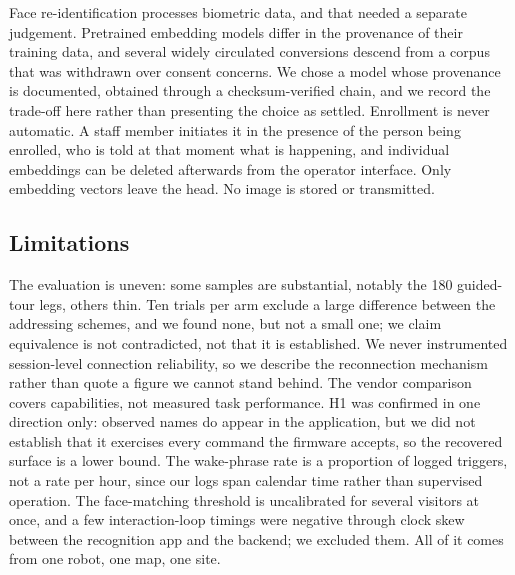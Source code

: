 Face re-identification processes biometric data, and that needed a separate judgement.
Pretrained embedding models differ in the provenance of their training data, and several widely
circulated conversions descend from a corpus that was withdrawn over consent concerns. We chose
a model whose provenance is documented, obtained through a checksum-verified chain, and we
record the trade-off here rather than presenting the choice as settled. Enrollment is never
automatic. A staff member initiates it in the presence of the person being enrolled, who is told
at that moment what is happening, and individual embeddings can be deleted afterwards from the
operator interface. Only embedding vectors leave the head. No image is stored or transmitted.

\subsection{Limitations}

The evaluation is uneven: some samples are substantial, notably the \num{180} guided-tour legs,
others thin. Ten trials per arm exclude a large difference between the addressing schemes, and we
found none, but not a small one; we claim equivalence is not contradicted, not that it is
established. We never instrumented session-level connection reliability, so we describe the
reconnection mechanism rather than quote a figure we cannot stand behind. The vendor comparison
covers capabilities, not measured task performance. H1 was confirmed in one direction only:
observed names do appear in the application, but we did not establish that it exercises every
command the firmware accepts, so the recovered surface is a lower bound. The wake-phrase rate is
a proportion of logged triggers, not a rate per hour, since our logs span calendar time rather
than supervised operation. The face-matching threshold is uncalibrated for several visitors at
once, and a few interaction-loop timings were negative through clock skew between the recognition
app and the backend; we excluded them. All of it comes from one robot, one map, one site.

